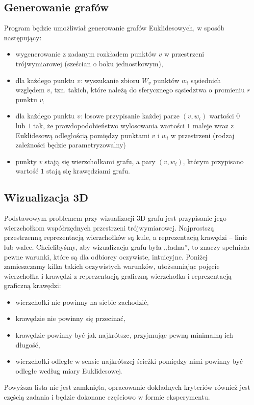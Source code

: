 \documentclass[a4paper,onecolumn,oneside,12pt]{mwart}
\begin{document}
\subsection{Generowanie grafów}
Program będzie umożliwiał generowanie grafów Euklidesowych, w sposób
następujący:
\begin{itemize}
	\item wygenerowanie z zadanym rozkładem punktów $v$ w przestrzeni trójwymiarowej
    (sześcian o boku jednostkowym),
	\item dla każdego punktu $v$: wyszukanie zbioru $W_v$ punktów $w_i$
		sąsiednich względem $v$, tzn. takich, które należą do sferycznego
		sąsiedztwa o promieniu $r$ punktu $v$,
	\item dla każdego punktu $v$: losowe przypisanie każdej parze $(v,
		w_i)$ wartości $0$ lub $1$ tak, że prawdopodobieństwo wylosowania
		wartości $1$ maleje wraz z Euklidesową odległością pomiędzy
		punktami $v$ i $w_i$ w przestrzeni (rodzaj zależności będzie parametryzowalny)
	\item punkty $v$ stają się wierzchołkami grafu, a pary $(v, w_i)$,
		którym przypisano wartość $1$ stają się krawędziami grafu.
\end{itemize}

\subsection{Wizualizacja 3D}

Podstawowym problemem przy wizualizacji 3D grafu jest przypisanie jego
wierzchołkom współrzędnych przestrzeni trójwymiarowej. Najprostszą
przestrzenną reprezentacją wierzchołków są kule, a reprezentacją krawędzi
-- linie lub walce. Chcielibyśmy, aby wizualizacja grafu była ,,ładna'', to
znaczy spełniała pewne warunki, które są dla odbiorcy oczywiste,
intuicyjne. Poniżej zamieszczamy kilka takich oczywistych warunków,
utożsamiając pojęcie wierzchołka i krawędzi z reprezentacją graficzną
wierzchołka i reprezentacją graficzną krawędzi:
\begin{itemize}
	\item wierzchołki nie powinny na siebie zachodzić,
	\item krawędzie nie powinny się przecinać,
	\item krawędzie powinny być jak najkrótsze, przyjmując pewną minimalną
		ich długość,
	\item wierzchołki odległe w sensie najkrótszej ścieżki pomiędzy nimi
		powinny być odległe według miary Euklidesowej.
\end{itemize}
Powyższa lista nie jest zamknięta, opracowanie dokładnych kryteriów również
jest częścią zadania i będzie dokonane częściowo w formie eksperymentu.
\end{document}
